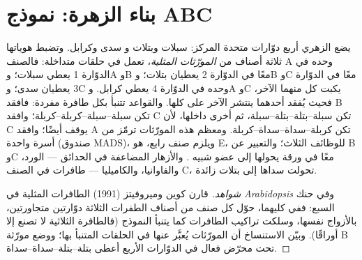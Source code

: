 \section{بناء الزهرة: نموذج ABC}

\begin{proposition}\label{prop:b2:plant-flowering:abc}
يضع  الزهري أربع دوّارات متحدة المركز: سبلات وبتلات و
سدى وكرابل. وتضبط هوياتها ثلاثة أصناف من
\emph{المورّثات المثلية}، تعمل في حلقات متداخلة: فالصنف A وحده
في الدوّارة 1 يعطي سبلات؛ وA وB معًا في الدوّارة 2 يعطيان بتلات؛
وB وC معًا في الدوّارة 3 يعطيان سدى؛ وC وحده في الدوّارة 4 يعطي
كرابل. وA وC يكبت كل منهما الآخر، فحيث يُفقد أحدهما
ينتشر الآخر على  كلها. والقواعد تتنبأ بكل طافرة
مفردة: فافقد B تكن  سبلة--سبلة--كربلة--كربلة؛
وافقد C تكن سبلة--بتلة--بتلة--سبلة، ثم  أخرى
داخلها، لأن C يوقف  أيضًا؛ وافقد A تكن
كربلة--سداة--سداة--كربلة. ومعظم هذه المورّثات ترمّز
 من أسرة واحدة (صندوق MADS)، ويلزم صنف
رابع، هو E، للوظائف الثلاث؛ والتعبير عن B وC
معًا في ورقة يحولها إلى عضو شبيه .
والأزهار المضاعفة في الحدائق --- الورد، والفاوانيا، والكاميليا --- طافرات
في الصنف C، تحولت سداها إلى بتلات زائدة.
\end{proposition}
\begin{proof}[شواهد]
قارن كوين وميروفيتز (1991) الطافرات المثلية في
\emph{Arabidopsis} وفي حنك السبع: ففي كليهما، حوّل كل صنف من أصناف
الطفرات الثلاثة دوّارتين متجاورتين، بالأزواج نفسها،
وسلكت تراكيب الطافرات كما يتنبأ النموذج (فالطافرة
الثلاثية لا تصنع إلا أوراقًا). وبيّن الاستنساخ أن المورّثات
 يُعبَّر عنها في الحلقات المتنبأ بها؛ ووضع
مورّثة B تحت محرّض فعال في الدوّارات الأربع أعطى
بتلة--بتلة--سداة--سداة.
\end{proof}

